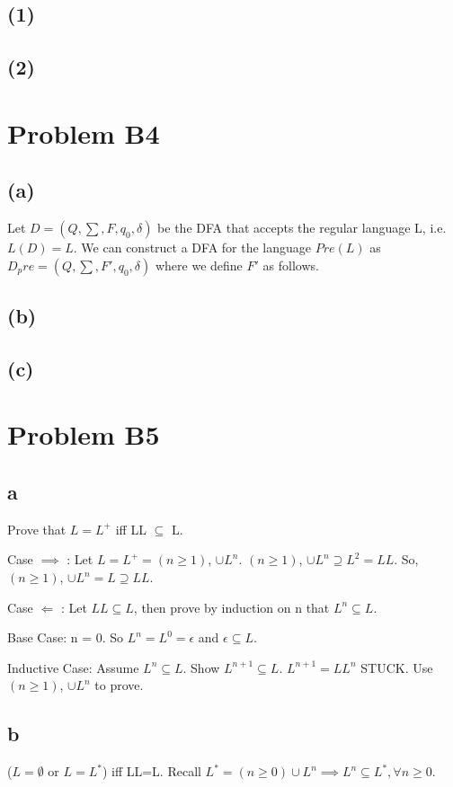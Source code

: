 \documentclass[12pt]{article}
\begin{document}
\subsection*{(1)}
\subsection*{(2)}

\section*{Problem B4}
\subsection*{(a)}
  Let $D = (Q, \sum, F, q_0, \delta)$ be the DFA that accepts the regular
  language L, i.e. $L(D) = L$. We can construct a DFA for the language
  $Pre(L)$ as $D_pre = (Q, \sum, F', q_0, \delta)$ where we define $F'$
  as follows.
\subsection*{(b)}
\subsection*{(c)}

\section*{Problem B5}
\subsection*{a}
Prove that $L=L^+$ iff LL $\subseteq$ L.

\medskip

Case $\implies$ : Let $L=L^+ = (n \ge 1)$, $ \cup L^n$. $(n \ge 1)$, $ \cup L^n \supseteq L^2 = LL$. So, $(n \ge 1)$, $ \cup L^n = L \supseteq LL$.

\medskip

Case $\Longleftarrow$ : Let $LL \subseteq L$, then prove by induction on n that $L^n \subseteq L$.

\medskip

Base Case: n = 0. So $L^n = L^0  = \epsilon$ and $\epsilon \subseteq L$.

Inductive Case: Assume $L^n \subseteq L$. Show $L^{n+1} \subseteq L$. $L^{n+1} = LL^{n}$ STUCK. Use $(n \ge 1)$, $ \cup L^n$ to prove.


\subsection*{b}
($L=\emptyset$ or $L=L^*$) iff LL=L. Recall $L^\ast = (n \ge 0) \cup L^n \implies L^n \subseteq L^\ast , \forall n \ge 0$.
\end{document}
